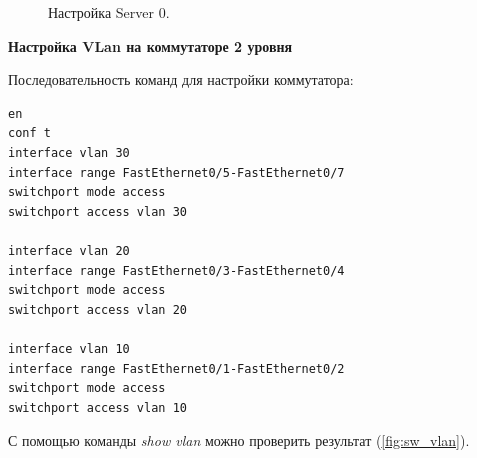 \documentclass[a4paper,14pt]{article}
\begin{document}
\begin{figure}[!h]
    \caption{Настройка Server 0.}
    \label{fig:server0}
\end{figure}

\textbf{Настройка VLan на коммутаторе 2 уровня}

Последовательность команд для настройки коммутатора:

\begin{lstlisting}
en
conf t
interface vlan 30
interface range FastEthernet0/5-FastEthernet0/7
switchport mode access
switchport access vlan 30

interface vlan 20
interface range FastEthernet0/3-FastEthernet0/4
switchport mode access
switchport access vlan 20

interface vlan 10
interface range FastEthernet0/1-FastEthernet0/2
switchport mode access
switchport access vlan 10
\end{lstlisting}

С помощью команды \textit{show vlan} можно проверить результат (\ref{fig:sw_vlan}).
\end{document}
